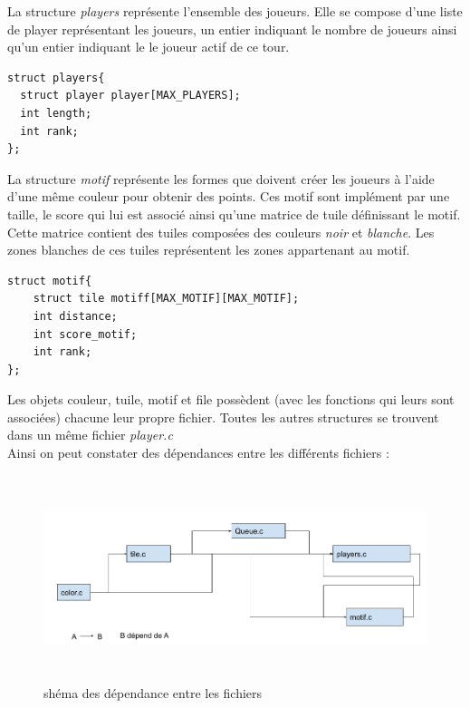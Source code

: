 \documentclass[12pt,a4paper]{extarticle}
\begin{document}
    
    La structure \emph{players} repr\'esente l'ensemble des joueurs. Elle se compose d'une liste de player repr\'esentant les joueurs, un entier indiquant le nombre de 
    joueurs ainsi qu'un entier indiquant le le joueur actif de ce tour.
    

    \begin{lstlisting}[style=CStyle]
struct players{
  struct player player[MAX_PLAYERS];
  int length;
  int rank;
}; \end{lstlisting}
    
    
    La structure \emph{motif} repr\'esente les formes que doivent cr\'eer les joueurs \`a l'aide d'une m\^eme couleur pour obtenir des points. Ces motif sont impl\'ement
     par une taille, le score qui lui est associ\'e  ainsi qu'une matrice de tuile d\'efinissant le motif. Cette matrice contient des tuiles compos\'ees 
     des couleurs \emph{noir} et \emph{blanche}. Les zones blanches de ces tuiles repr\'esentent les zones appartenant au motif.
    

     \begin{lstlisting}[style=CStyle]
struct motif{
    struct tile motiff[MAX_MOTIF][MAX_MOTIF];
    int distance;
    int score_motif;
    int rank;
}; \end{lstlisting}
     
     
    Les objets couleur, tuile, motif et file poss\`edent (avec les fonctions qui leurs sont associ\'ees) chacune leur propre fichier. Toutes les autres structures
    se trouvent dans un m\^eme fichier \emph{player.c}
    \newline \\
    Ainsi on peut constater des d\'ependances entre les diff\'erents fichiers :
    \begin{figure}[h!]
        \centering
        \includegraphics[height=6cm,width=15cm]{img/schemadependance}
        \caption{sh\'ema des d\'ependance entre les fichiers}
    \end{figure}
\end{document}
